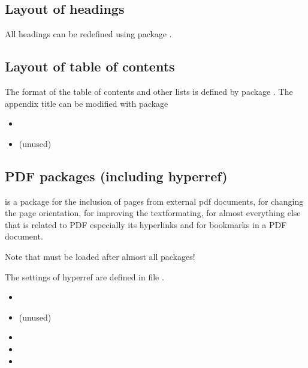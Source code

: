 
\subsection{Layout of headings}

All headings can be redefined using package .


\subsection{Layout of table of contents}

The format of the table of contents and other lists is defined by package . The appendix title can be modified with package 

\begin{itemize}[noitemsep]
\item {}
\item {} (unused)
\end{itemize}


\subsection{PDF packages (including hyperref)}

 is a package for the inclusion of pages from external pdf documents,
 for changing the page orientation,
 for improving the textformating,
 for almost everything else that is related to PDF especially its hyperlinks and 
 for bookmarks in a PDF document.

Note that  must be loaded after almost all packages!

The settings of hyperref are defined in file 
.

\begin{itemize}[noitemsep]
\item {}
\item {} (unused)
\item {}
\item {}
\item {}
\end{itemize}


